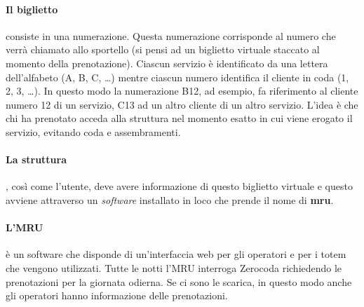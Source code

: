 \paragraph{Il biglietto} consiste in una numerazione. Questa numerazione corrisponde al numero che verrà chiamato allo sportello (si pensi ad un biglietto virtuale staccato al momento della prenotazione). Ciascun servizio è identificato da una lettera dell’alfabeto (A, B, C, \dots) mentre ciascun numero identifica il cliente in coda (1, 2, 3, \dots). In questo modo la numerazione B12, ad esempio, fa riferimento al cliente numero 12 di un servizio, C13 ad un altro cliente di un altro servizio. L’idea è che chi ha prenotato acceda alla struttura nel momento esatto in cui viene erogato il servizio, evitando coda e assembramenti.
\paragraph{La struttura}, così come l’utente, deve avere informazione di questo biglietto virtuale e questo avviene attraverso un \textsl{software} installato in loco che prende il nome di \textbf{mru}.
\paragraph{L'MRU} è un software che disponde di un'interfaccia web per gli operatori e per i totem che vengono utilizzati. Tutte le notti l'MRU interroga Zerocoda richiedendo le prenotazioni per la giornata odierna. Se ci sono le scarica, in questo modo anche gli operatori hanno informazione delle prenotazioni.

